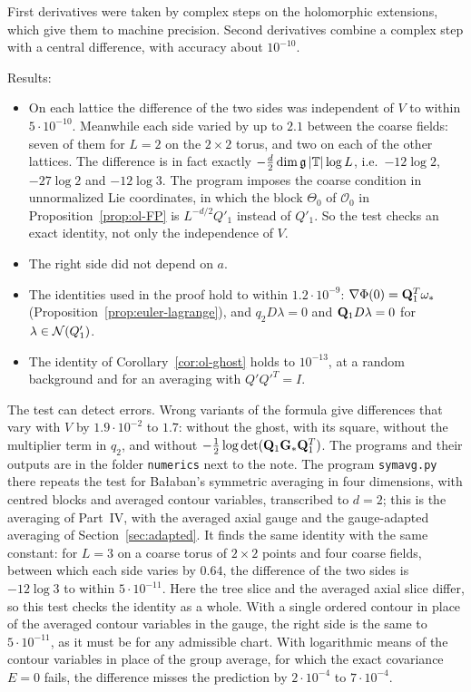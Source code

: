 First derivatives were taken by complex steps on the holomorphic extensions, which give them to machine precision. Second derivatives combine a complex step with a central difference, with accuracy about $10^{-10}$.

Results:
\begin{itemize}
\item On each lattice the difference of the two sides was independent of $V$ to within $5\cdot10^{-10}$. Meanwhile each side varied by up to $2.1$ between the coarse fields: seven of them for $L=2$ on the $2\times2$ torus, and two on each of the other lattices. The difference is in fact exactly $-\frac d2\dim\mathfrak g\,|\mathbb T|\log L$, i.e.\ $-12\log2$, $-27\log2$ and $-12\log3$. The program imposes the coarse condition in unnormalized Lie coordinates, in which the block $\Theta_0$ of $\mathcal O_0$ in Proposition~\ref{prop:ol-FP} is $L^{-d/2}Q'_1$ instead of $Q'_1$. So the test checks an exact identity, not only the independence of $V$.
\item The right side did not depend on $a$.
\item The identities used in the proof hold to within $1.2\cdot10^{-9}$: $\nabla\Phi(0)=\mathbf Q_1^T\omega_*$ (Proposition~\ref{prop:euler-lagrange}), and $q_2D\lambda=0$ and $\mathbf Q_1D\lambda=0$ for $\lambda\in\mathcal N(Q'_1)$.
\item The identity of Corollary~\ref{cor:ol-ghost} holds to $10^{-13}$, at a random background and for an averaging with $Q'Q'^T=I$.
\end{itemize}
The test can detect errors. Wrong variants of the formula give differences that vary with $V$ by $1.9\cdot10^{-2}$ to $1.7$: without the ghost, with its square, without the multiplier term in $q_2$, and without $-\frac12\log\det(\mathbf Q_1\mathbf G_*\mathbf Q_1^T)$. The programs and their outputs are in the folder \texttt{numerics} next to the note. The program \texttt{symavg.py} there repeats the test for Ba\l aban's symmetric averaging in four dimensions, with centred blocks and averaged contour variables, transcribed to $d=2$; this is the averaging of Part~IV, with the averaged axial gauge and the gauge-adapted averaging of Section~\ref{sec:adapted}. It finds the same identity with the same constant: for $L=3$ on a coarse torus of $2\times2$ points and four coarse fields, between which each side varies by $0.64$, the difference of the two sides is $-12\log3$ to within $5\cdot10^{-11}$. Here the tree slice and the averaged axial slice differ, so this test checks the identity as a whole. With a single ordered contour in place of the averaged contour variables in the gauge, the right side is the same to $5\cdot10^{-11}$, as it must be for any admissible chart. With logarithmic means of the contour variables in place of the group average, for which the exact covariance $E=0$ fails, the difference misses the prediction by $2\cdot10^{-4}$ to $7\cdot10^{-4}$.

